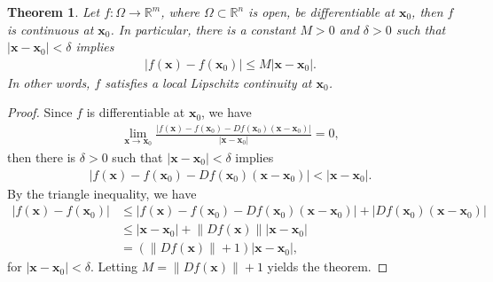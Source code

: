 \documentclass[11pt]{book}
\newtheorem{theorem}{Theorem}[chapter]
\theoremstyle{definition}
\numberwithin{equation}{chapter}
\begin{document}
\begin{theorem}
Let $f: \Omega \to \mathbb{R}^m$, where $\Omega \subset \mathbb{R}^n$ is open, be differentiable at $\mathbf{x}_0$, then $f$ is continuous at $\mathbf{x}_0$. In particular, there is a constant $M > 0$ and $\delta > 0$ such that $\left|\mathbf{x} - \mathbf{x}_0\right| < \delta$ implies 
\begin{align*}
    \left|f(\mathbf{x}) - f(\mathbf{x}_0)\right| \leq M \left|\mathbf{x} - \mathbf{x}_0\right|.
\end{align*}
In other words, $f$ satisfies a local Lipschitz continuity at $\mathbf{x}_0$.
\end{theorem}
\begin{proof}
Since $f$ is differentiable at $\mathbf{x}_0$, we have
\begin{align*}
    \lim_{\mathbf{x} \to \mathbf{x}_0} \frac{\left|f(\mathbf{x}) - f(\mathbf{x}_0) - Df(\mathbf{x}_0) (\mathbf{x} - \mathbf{x}_0)\right|}{\left|\mathbf{x} - \mathbf{x}_0\right|} = 0,
\end{align*}
then there is $\delta > 0$ such that $\left|\mathbf{x} - \mathbf{x}_0\right| < \delta$ implies
\begin{align*}
    \left|f(\mathbf{x}) - f(\mathbf{x}_0) - Df(\mathbf{x}_0) (\mathbf{x} - \mathbf{x}_0)\right| < \left|\mathbf{x} - \mathbf{x}_0\right|.
\end{align*}
By the triangle inequality, we have
\begin{align*}
    \left|f(\mathbf{x}) - f(\mathbf{x}_0)\right| & \leq \left|f(\mathbf{x}) - f(\mathbf{x}_0) - Df(\mathbf{x}_0) (\mathbf{x} - \mathbf{x}_0)\right| + \left|Df(\mathbf{x}_0) (\mathbf{x} - \mathbf{x}_0)\right| \\
    & \leq \left|\mathbf{x} - \mathbf{x}_0\right| + \left\|Df(\mathbf{x})\right\| \left|\mathbf{x} - \mathbf{x}_0\right| \\
    & = \left(\left\|Df(\mathbf{x})\right\| + 1\right) \left|\mathbf{x} - \mathbf{x}_0\right|,
\end{align*}
for $\left|\mathbf{x} - \mathbf{x}_0\right| < \delta$. Letting $M = \left\|Df(\mathbf{x})\right\| + 1$ yields the theorem.
\end{proof}

\medskip
\end{document}
